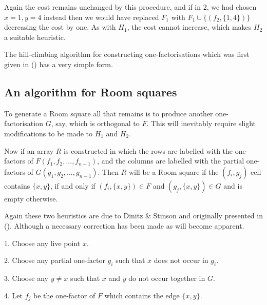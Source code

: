 \documentclass[
  11pt,
  a4paper]{book}
\begin{document}
Again the cost remains unchanged by this procedure, and if in 2, we had
chosen \(x = 1, y = 4\) instead then we would have replaced \(F_1\) with
\(F_1 \cup \{(f_2, \{1, 4\})\}\) decreasing the cost by one. As with
\(H_1\), the cost cannot increase, which makes \(H_2\) a suitable
heuristic.

The hill-climbing algorithm for constructing one-factorisations which
was first given in (\textcite{dinitz_hill-climbing_1987}) has a very
simple form.

\begin{algorithm}[H]
\end{algorithm}

\hypertarget{an-algorithm-for-room-squares}{%
\subsection{An algorithm for Room
squares}\label{an-algorithm-for-room-squares}}

To generate a Room square all that remains is to produce another
one-factorisation \(G\), say, which is orthogonal to \(F\). This will
inevitably require slight modifications to be made to \(H_1\) and
\(H_2\).

Now if an array \(R\) is constructed in which the rows are labelled with
the one-factors of \(F(f_1,f_2,...,f_{n-1})\), and the columns are
labelled with the partial one-factors of \(G(g_1,g_2,...,g_{n-1})\).
Then \(R\) will be a Room square if the \((f_i,g_j)\) cell contains
\(\{x,y\}\), if and only if \((f_i,\{x,y\}) \in F\) and
\((g_j,\{x,y\}) \in G\) and is empty otherwise.

Again these two heuristics are due to Dinitz \& Stinson and originally
presented in (\textcite{dinitz_hill-climbing_1987}). Although a
necessary correction has been made as will become apparent.

\begin{algorithm}[H]
  1. Choose any live point $x$.

  2. Choose any partial one-factor $g_i$ such that $x$ does
     not occur in $g_i$.

  3. Choose any $y \neq x$ such that $x$ and $y$ do not occur
     together in $G$.

  4. Let $f_j$ be the one-factor of $F$ which contains the 
     edge $\{x, y\}$.
     
\caption{$OH_1$}
\end{algorithm}
\end{document}

